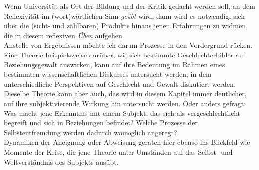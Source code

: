 \noindent Wenn Universität als Ort der Bildung und der Kritik gedacht
werden soll, an dem Reflexivität im (wort)wörtlichen Sinn \textit{geübt} wird, dann wird
es notwendig, sich über die (sicht- und zählbaren) Produkte hinaus jenen
Erfahrungen zu widmen, die in diesem reflexiven \textit{Üben} aufgehen.\\
Anstelle von
Ergebnissen möchte ich darum Prozesse in den Vordergrund rücken.\\  

Eine Theorie
beispielsweise darüber, wie sich bestimmte Geschlechterbilder auf
Beziehungsgewalt auswirken, kann auf ihre Bedeutung im Rahmen eines bestimmten
wissenschaftlichen Diskurses untersucht werden, in dem unterschiedliche
Perspektiven auf Geschlecht und Gewalt diskutiert werden. Dieselbe Theorie kann
aber auch, das wird in diesem Kapitel immer deutlicher, auf ihre
subjektivierende Wirkung hin untersucht werden. Oder anders gefragt:\\
Was macht
jene Erkenntnis mit einem Subjekt, das sich als vergeschlechtlicht begreift und
sich in Beziehungen befindet? Welche Prozesse der Selbstentfremdung werden
dadurch womöglich angeregt?\\
Dynamiken der Aneignung oder Abweisung geraten
hier ebenso ins Blickfeld wie Momente der Krise, die jene Theorie unter
Umständen auf das Selbst- und Weltverständnis des Subjekts ausübt. \\
 
